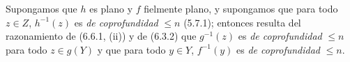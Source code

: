 \begin{remark}[6.6.2]
\label{IV.2.s6.6.2-fr}
Supongamos que $h$ es plano y $f$ fielmente plano, y supongamos que para
todo $z\in Z$, $h^{-1}(z)$ es \emph{de coprofundidad} $\leqslant n$ (5.7.1);
entonces resulta del razonamiento de (6.6.1, (ii)) y de (6.3.2) que
$g^{-1}(z)$ es \emph{de coprofundidad} $\leqslant n$ para todo $z\in g(Y)$ y
que para todo $y\in Y$, $f^{-1}(y)$ es \emph{de coprofundidad} $\leqslant n$.
\end{remark}
